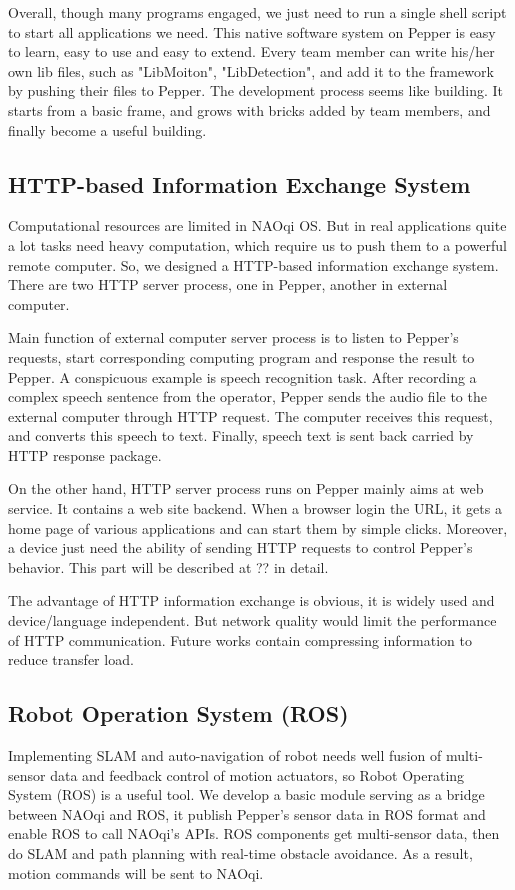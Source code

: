 Overall, though many programs engaged, we just need to run a single shell script to start all applications we need. 
This native software system on Pepper is easy to learn, easy to use and easy to extend. 
Every team member can write his/her own lib files, such as "LibMoiton", "LibDetection", and add it to the framework by pushing their files to Pepper. 
The development process seems like building. It starts from a basic frame, and grows with bricks added by team members, and finally become a useful building.

\subsection{HTTP-based Information Exchange System}
\label{subsec:http}
Computational resources are limited in NAOqi OS. 
But in real applications quite a lot tasks need heavy computation, which require us to push them to a powerful remote computer.
So, we designed a HTTP-based information exchange system. There are two HTTP server process, one in Pepper, another in external computer. 

Main function of external computer server process is to listen to Pepper’s requests, start corresponding computing program and response the result to Pepper. 
A conspicuous example is speech recognition task. 
After recording a complex speech sentence from the operator, Pepper sends the audio file to the external computer through HTTP request. 
The computer receives this request, and converts this speech to text. 
Finally, speech text is sent back carried by HTTP response package. 

On the other hand, HTTP server process runs on Pepper mainly aims at web service. 
It contains a web site backend. 
When a browser login the URL, it gets a home page of various applications and can start them by simple clicks. 
Moreover, a device just need the ability of sending HTTP requests to control Pepper’s behavior. 
This part will be described at ?? in detail. 

The advantage of HTTP information exchange is obvious, it is widely used and device/language independent. 
But network quality would limit the performance of HTTP communication. 
Future works contain compressing information to reduce transfer load.

\subsection{Robot Operation System (ROS)}
\label{subsec:ros}

Implementing SLAM and auto-navigation of robot needs well fusion of multi-sensor data and feedback control of motion actuators, so Robot Operating System (ROS) is a useful tool. 
We develop a basic module serving as a bridge between NAOqi and ROS, it publish Pepper’s sensor data in ROS format and enable ROS to call NAOqi’s APIs. 
ROS components get multi-sensor data, then do SLAM and path planning with real-time obstacle avoidance. 
As a result, motion commands will be sent to NAOqi.